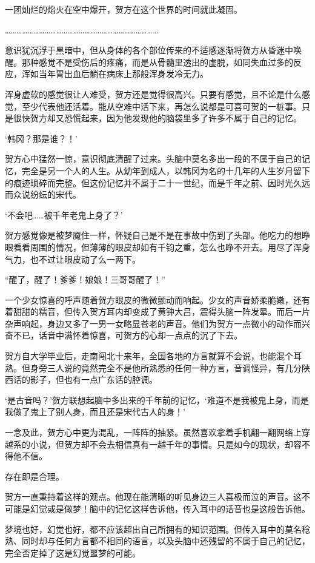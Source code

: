 一团灿烂的焰火在空中爆开，贺方在这个世界的时间就此凝固。

………………………………………………………………………

意识犹沉浮于黑暗中，但从身体的各个部位传来的不适感逐渐将贺方从昏迷中唤醒。那种感觉不是受伤后的疼痛，而是从骨髓里透出的虚脱，如同失血过多的反应，浑如当年胃出血后躺在病床上那般浑身发冷无力。

浑身虚软的感觉很让人难受，贺方还是觉得很高兴。只要有感觉，且不论是什么感觉，至少代表他还活着。能从空难中活下来，再怎么说都是可喜可贺的一桩事。只是很快贺方却又恐慌起来，因为他发现他的脑袋里多了许多不属于自己的记忆。

‘韩冈？那是谁？！’

贺方心中猛然一惊，意识彻底清醒了过来。头脑中莫名多出一段的不属于自己的记忆，完全是另一个人的人生。从幼年到成人，以韩冈为名的十几年的人生岁月留下的痕迹琐碎而完整。但这份记忆并不属于二十一世纪，而是千年之前、因时光久远而众说纷纭的宋代。

‘不会吧……被千年老鬼上身了？’

贺方感觉像是被梦魇住一样，怀疑自己是不是在事故中伤到了头部。他吃力的想睁眼看看周围的情况，但薄薄的眼皮却如有千钧之重，怎么也睁不开去。用尽了浑身气力，也不过让眼皮动了么一两下。

“醒了，醒了！爹爹！娘娘！三哥哥醒了！”

一个少女惊喜的呼声随着贺方眼皮的微微颤动而响起。少女的声音娇柔脆嫩，还有着甜甜的糯音，但传入贺方耳内却变成了黄钟大吕，震得头脑一阵发晕。而后一片杂声响起，身边又多了一男一女略显苍老的声音。他们为贺方一点微小的动作而兴奋不已，话音中满怀着惊喜，可贺方的心却一点点的沉了下去。

贺方自大学毕业后，走南闯北十来年，全国各地的方言就算不会说，也能混个耳熟。但身旁三人说的竟然完全不是他所熟悉的任何一种方言，音调怪异，有几分陕西话的影子，但也有一点广东话的腔调。

‘是古音吗？’贺方联想起脑中多出来的千年前的记忆，‘难道不是我被鬼上身，而是我做了鬼上了别人身，而且还是宋代古人的身！’

一念及此，贺方心中更为混乱，一阵阵的抽紧。虽然喜欢拿着手机翻一翻网络上穿越系的小说，但贺方却不会去相信真有一越千年的事情。只是如今的现状，却容不得他不信。

存在即是合理。

贺方一直秉持着这样的观点。他现在能清晰的听见身边三人喜极而泣的声音。这不可能是幻觉或是做梦！脑中的记忆这样告诉他，传入耳中的话音也是这般告诉他。

梦境也好，幻觉也好，都不应该超出自己所拥有的知识范围。但传入耳中的莫名稔熟、同时却与任何方言都不相同的语言，以及头脑中还残留的不属于自己的记忆，完全否定掉了这是幻觉噩梦的可能。

